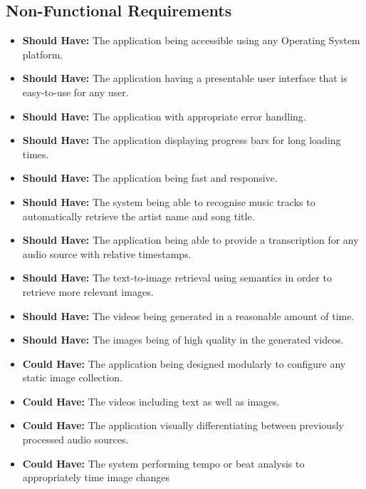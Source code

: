 \documentclass{l4proj}
\begin{document}
\subsection{Non-Functional Requirements}
\begin{itemize}
    \item \textbf{Should Have:} The application being accessible using any Operating System platform.
    \item \textbf{Should Have:} The application having a presentable user interface that is easy-to-use for any user.
    \item \textbf{Should Have:} The application with appropriate error handling.
    \item \textbf{Should Have:} The application displaying progress bars for long loading times.
    \item \textbf{Should Have:} The application being fast and responsive.
    \item \textbf{Should Have:} The system being able to recognise music tracks to automatically retrieve the artist name and song title.
    \item \textbf{Should Have:} The application being able to provide a transcription for any audio source with relative timestamps.
    \item \textbf{Should Have:} The text-to-image retrieval using semantics in order to retrieve more relevant images.
    \item \textbf{Should Have:} The videos being generated in a reasonable amount of time.
    \item \textbf{Should Have:} The images being of high quality in the generated videos.
    \item \textbf{Could Have:} The application being designed modularly to configure any static image collection.
    \item \textbf{Could Have:} The videos including text as well as images.
    \item \textbf{Could Have:} The application visually differentiating between previously processed audio sources.
    \item \textbf{Could Have:} The system performing tempo or beat analysis to appropriately time image changes
\end{itemize}

\end{document}
